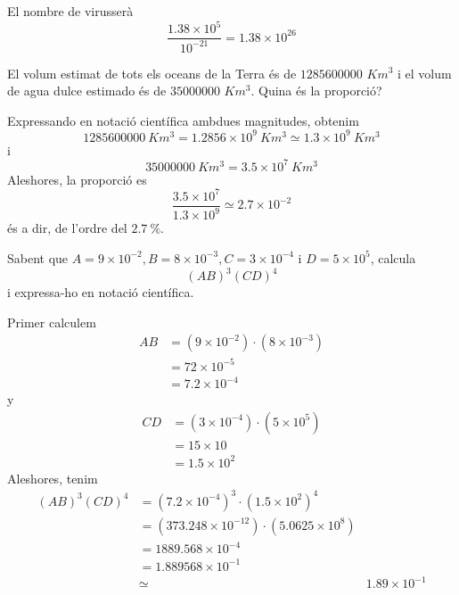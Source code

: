 \begin{solucio}
El nombre de virusserà%
\begin{equation*}
\frac{1.38\times 10^{5}}{10^{-21}}=1.38\times 10^{26}
\end{equation*}
\end{solucio}

\begin{exercici}
El volum estimat de tots els oceans de la Terra és de $1285600000$ 
$Km^{3}$ i el volum de agua dulce estimado és de $35000000$ $Km^{3}$. 
Quina és la proporció?

\end{exercici}

\begin{solucio}
Expressando en notació científica ambdues magnitudes, obtenim%
\begin{equation*}
1285600000~Km^{3}=1.2856\times 10^{9}~Km^{3}\simeq 1.3\times 10^{9}~Km^{3}
\end{equation*}%
i%
\begin{equation*}
35000000~Km^{3}=3.5\times 10^{7}~Km^{3}
\end{equation*}%
Aleshores, la proporció es%
\begin{equation*}
\frac{3.5\times 10^{7}}{1.3\times 10^{9}}\simeq 2.7\times 10^{-2}
\end{equation*}%
és a dir, de l’ordre del $2.7~\%$.
\end{solucio}

\begin{exercici}
Sabent que $A=9\times 10^{-2},B=8\times 10^{-3},C=3\times 10^{-4}$ i $%
D=5\times 10^{5}$, calcula%
\begin{equation*}
\left( AB\right) ^{3}\left( CD\right) ^{4}
\end{equation*}%
i expressa-ho en notació científica.

\end{exercici}

\begin{solucio}
Primer calculem%
\begin{align*}
AB &=\left( 9\times 10^{-2}\right) \cdot \left( 8\times 10^{-3}\right) \\
&=72\times 10^{-5} \\
&=7.2\times 10^{-4}
\end{align*}%
y%
\begin{align*}
CD &=\left( 3\times 10^{-4}\right) \cdot \left( 5\times 10^{5}\right) \\
&=15\times 10 \\
&=1.5\times 10^{2}
\end{align*}%
Aleshores, tenim%
\begin{align*}
\left( AB\right) ^{3}\left( CD\right) ^{4} &=\left( 7.2\times
10^{-4}\right) ^{3}\cdot \left( 1.5\times 10^{2}\right) ^{4} \\
&=\left( 373.248\times 10^{-12}\right) \cdot \left( 5.0625\times
10^{8}\right) \\
&=1889.568\times 10^{-4} \\
&=1.889568\times 10^{-1} \\
&\simeq &1.89\times 10^{-1}
\end{align*}
\end{solucio}

